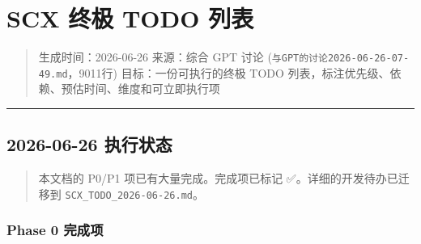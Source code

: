 \documentclass[
  12pt,
]{ctexart}
\author{SCX}
\date{2026}
\begin{document}
\section{SCX 终极 TODO 列表}\label{scx-ux7ec8ux6781-todo-ux5217ux8868}

\begin{quote}
生成时间：2026-06-26 来源：综合 GPT 讨论
(\texttt{与GPT的讨论2026-06-26-07-49.md}，9011行) 目标：一份可执行的终极
TODO 列表，标注优先级、依赖、预估时间、维度和可立即执行项
\end{quote}

\begin{center}\rule{0.5\linewidth}{0.5pt}\end{center}

\subsection{2026-06-26 执行状态}\label{ux6267ux884cux72b6ux6001}

\begin{quote}
本文档的 P0/P1 项已有大量完成。完成项已标记 ✅。详细的开发待办已迁移到
\texttt{SCX\_TODO\_2026-06-26.md}。
\end{quote}

\subsubsection{Phase 0 完成项}\label{phase-0-ux5b8cux6210ux9879}
\end{document}
